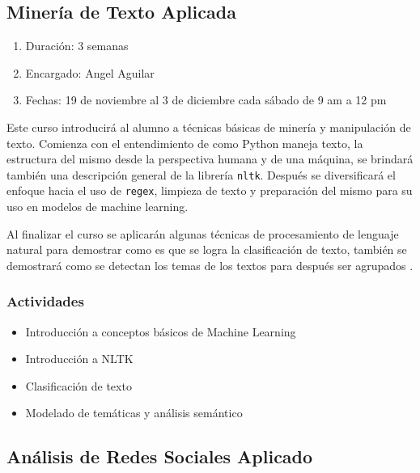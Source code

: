 \documentclass{article}
\begin{document}
        \subsection{Minería de Texto Aplicada}
                
            \begin{enumerate}
                \item Duración: 3 semanas
                \item Encargado: Angel Aguilar
                \item Fechas: 19 de noviembre al 3 de diciembre cada sábado de 9 am a 12 pm
            \end{enumerate}

            Este curso introducirá al alumno a técnicas básicas de minería y manipulación de texto. Comienza con el entendimiento de como Python maneja texto, la estructura del mismo desde la perspectiva humana y de una máquina, se brindará también una descripción general de la librería \texttt{nltk}. Después se diversificará el enfoque hacia el uso de \texttt{regex}, limpieza de texto y preparación del mismo para su uso en modelos de machine learning.

            Al finalizar el curso se aplicarán algunas técnicas de procesamiento de lenguaje natural para demostrar como es que se logra la clasificación de texto, también se demostrará como se detectan los temas de los textos para después ser agrupados \cite{text-mining}.

            \subsubsection{Actividades}
                    
                \begin{itemize}
                    \item Introducción a conceptos básicos de Machine Learning
                    \item Introducción a NLTK
                    \item Clasificación de texto
                    \item Modelado de temáticas y análisis semántico
                \end{itemize}

        \subsection{Análisis de Redes Sociales Aplicado}
\end{document}
